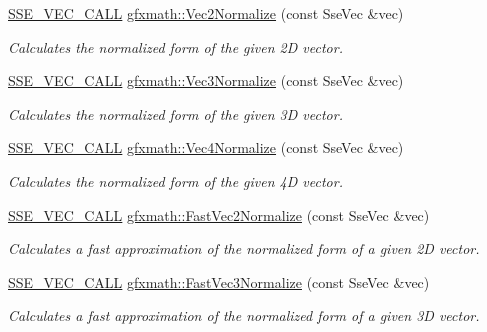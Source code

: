 \begin{DoxyCompactItemize}
\hyperlink{ssevec__math__defs_8h_a97454f977a5281455cecacce1e8ba670}{S\+S\+E\+\_\+\+V\+E\+C\+\_\+\+C\+A\+L\+L} \hyperlink{group___s_i_m_d_vec_math_ga448768708884eea249d85a7f73effb57}{gfxmath\+::\+Vec2\+Normalize} (const Sse\+Vec \&vec)
\begin{DoxyCompactList}\small\item\em Calculates the normalized form of the given 2\+D vector. \end{DoxyCompactList}\item 
\hyperlink{ssevec__math__defs_8h_a97454f977a5281455cecacce1e8ba670}{S\+S\+E\+\_\+\+V\+E\+C\+\_\+\+C\+A\+L\+L} \hyperlink{group___s_i_m_d_vec_math_gacaa2e633cd90a8081d82aa4d2ae55c4a}{gfxmath\+::\+Vec3\+Normalize} (const Sse\+Vec \&vec)
\begin{DoxyCompactList}\small\item\em Calculates the normalized form of the given 3\+D vector. \end{DoxyCompactList}\item 
\hyperlink{ssevec__math__defs_8h_a97454f977a5281455cecacce1e8ba670}{S\+S\+E\+\_\+\+V\+E\+C\+\_\+\+C\+A\+L\+L} \hyperlink{group___s_i_m_d_vec_math_gac08655a161a0dfafb1e1c74398ac84bb}{gfxmath\+::\+Vec4\+Normalize} (const Sse\+Vec \&vec)
\begin{DoxyCompactList}\small\item\em Calculates the normalized form of the given 4\+D vector. \end{DoxyCompactList}\item 
\hyperlink{ssevec__math__defs_8h_a97454f977a5281455cecacce1e8ba670}{S\+S\+E\+\_\+\+V\+E\+C\+\_\+\+C\+A\+L\+L} \hyperlink{group___s_i_m_d_vec_math_ga23748a5e8227b51330af5001eaaac478}{gfxmath\+::\+Fast\+Vec2\+Normalize} (const Sse\+Vec \&vec)
\begin{DoxyCompactList}\small\item\em Calculates a fast approximation of the normalized form of a given 2\+D vector. \end{DoxyCompactList}\item 
\hyperlink{ssevec__math__defs_8h_a97454f977a5281455cecacce1e8ba670}{S\+S\+E\+\_\+\+V\+E\+C\+\_\+\+C\+A\+L\+L} \hyperlink{group___s_i_m_d_vec_math_ga33037e7ea8bc698c45ca3f7b3a8ff671}{gfxmath\+::\+Fast\+Vec3\+Normalize} (const Sse\+Vec \&vec)
\begin{DoxyCompactList}\small\item\em Calculates a fast approximation of the normalized form of a given 3\+D vector. \end{DoxyCompactList}\item 

\end{DoxyCompactItemize}
